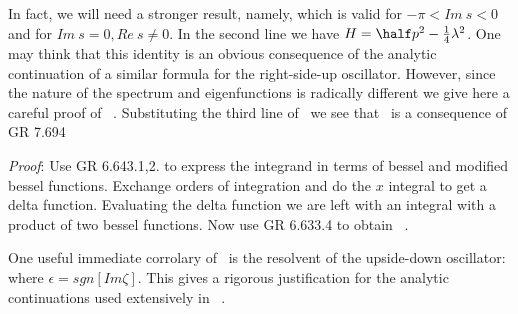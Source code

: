 In fact, we will need a stronger result, namely,
\eqn{}
which is valid for $-\pi<Im~s<0$ and for $Im~s=0,Re~s\not=0$.
In the second line we have $H=\half p^2-{1\over 4}\lambda^2$.
One may think that this identity is an obvious consequence of 
the analytic continuation of a similar formula for the 
right-side-up oscillator. However, since the nature of the 
spectrum and eigenfunctions is radically different we give 
here a careful proof of \lapi\ . Substituting the 
third line of \wvfnspl\wvfnsmi\ we see that \lapi\ is a 
consequence
of GR 7.694
\eqn{}

{\it Proof}: Use GR 6.643.1,2. to express the integrand 
in terms of bessel and 
modified bessel functions. Exchange orders of integration and do the $x$ 
integral to get a delta function. 
Evaluating the delta function we are left with 
an integral with a product of two bessel functions. Now use
GR 6.633.4 to obtain \grdshdient\ .
 
One useful immediate corrolary of \lapi\ 
is the resolvent of the upside-down oscillator:
\eqn{}
where $\epsilon=sgn[Im\zeta]$. This gives a rigorous justification
for the analytic continuations used extensively in \grkli\ .


